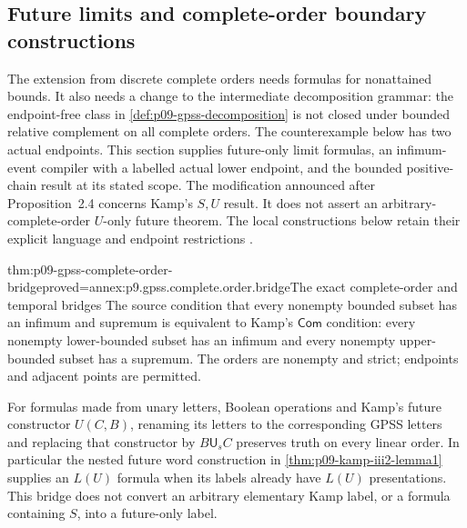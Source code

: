 
\subsection{Future limits and complete-order boundary constructions}
\label{sec:p09-gpss-complete-order-boundaries}

The extension from discrete complete orders needs formulas for nonattained
bounds. It also needs a change to the intermediate decomposition grammar:
the endpoint-free class in \cref{def:p09-gpss-decomposition} is not closed
under bounded relative complement on all complete orders. The counterexample
below has two actual endpoints. This section supplies future-only limit
formulas, an infimum-event compiler with a labelled actual lower endpoint,
and the bounded positive-chain result at its stated scope.
The modification announced after Proposition~2.4 concerns Kamp's
\(S,U\) result. It does not assert an arbitrary-complete-order
\(U\)-only future theorem. The local constructions below retain
their explicit language and endpoint restrictions
\cite[pp.~169--171]{GabbayPnueliShelahStavi1980}.

\begin{hblemma}{thm:p09-gpss-complete-order-bridge}{proved=annex:p9.gpss.complete.order.bridge}{The exact complete-order and temporal bridges}
The source condition that every nonempty bounded subset has an infimum and
supremum is equivalent to Kamp's \(\mathsf{Com}\) condition: every
nonempty lower-bounded subset has an infimum and every nonempty
upper-bounded subset has a supremum. The orders are nonempty and strict;
endpoints and adjacent points are permitted.

For formulas made from unary letters, Boolean operations and Kamp's
future constructor \(U(C,B)\), renaming its letters to the corresponding
GPSS letters and replacing that constructor by
\(B\mathbin{\mathsf U_s}C\) preserves truth on every linear order.
In particular the nested future word construction in
\cref{thm:p09-kamp-iii2-lemma1} supplies an \(L(U)\) formula when its
labels already have \(L(U)\) presentations. This bridge does not convert
an arbitrary elementary Kamp label, or a formula containing \(S\), into
a future-only label.
\end{hblemma}

